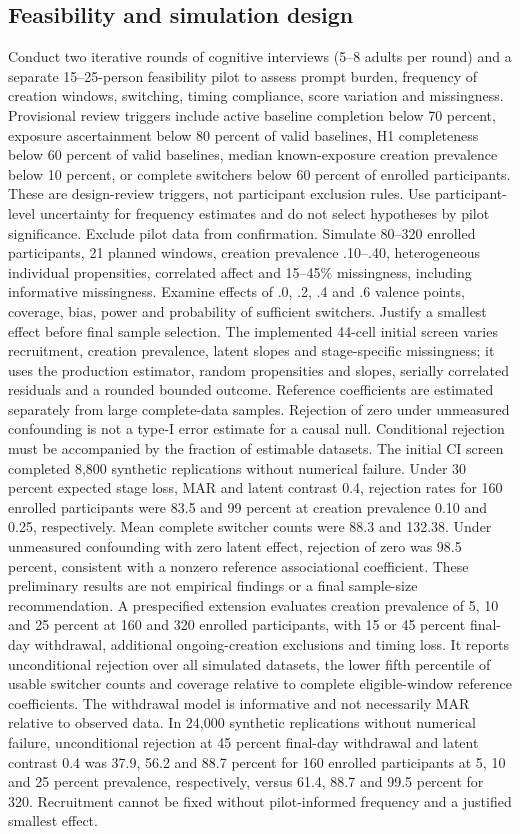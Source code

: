 \documentclass[11pt]{article}
\begin{document}
\subsection{Feasibility and simulation design}
Conduct two iterative rounds of cognitive interviews (5--8 adults per round) and a separate 15--25-person feasibility pilot to assess prompt burden, frequency of creation windows, switching, timing compliance, score variation and missingness. Provisional review triggers include active baseline completion below 70 percent, exposure ascertainment below 80 percent of valid baselines, H1 completeness below 60 percent of valid baselines, median known-exposure creation prevalence below 10 percent, or complete switchers below 60 percent of enrolled participants. These are design-review triggers, not participant exclusion rules. Use participant-level uncertainty for frequency estimates and do not select hypotheses by pilot significance. Exclude pilot data from confirmation. Simulate 80--320 enrolled participants, 21 planned windows, creation prevalence .10--.40, heterogeneous individual propensities, correlated affect and 15--45\% missingness, including informative missingness. Examine effects of .0, .2, .4 and .6 valence points, coverage, bias, power and probability of sufficient switchers. Justify a smallest effect before final sample selection. The implemented 44-cell initial screen varies recruitment, creation prevalence, latent slopes and stage-specific missingness; it uses the production estimator, random propensities and slopes, serially correlated residuals and a rounded bounded outcome. Reference coefficients are estimated separately from large complete-data samples. Rejection of zero under unmeasured confounding is not a type-I error estimate for a causal null. Conditional rejection must be accompanied by the fraction of estimable datasets. The initial CI screen completed 8,800 synthetic replications without numerical failure. Under 30 percent expected stage loss, MAR and latent contrast 0.4, rejection rates for 160 enrolled participants were 83.5 and 99 percent at creation prevalence 0.10 and 0.25, respectively. Mean complete switcher counts were 88.3 and 132.38. Under unmeasured confounding with zero latent effect, rejection of zero was 98.5 percent, consistent with a nonzero reference associational coefficient. These preliminary results are not empirical findings or a final sample-size recommendation. A prespecified extension evaluates creation prevalence of 5, 10 and 25 percent at 160 and 320 enrolled participants, with 15 or 45 percent final-day withdrawal, additional ongoing-creation exclusions and timing loss. It reports unconditional rejection over all simulated datasets, the lower fifth percentile of usable switcher counts and coverage relative to complete eligible-window reference coefficients. The withdrawal model is informative and not necessarily MAR relative to observed data. In 24,000 synthetic replications without numerical failure, unconditional rejection at 45 percent final-day withdrawal and latent contrast 0.4 was 37.9, 56.2 and 88.7 percent for 160 enrolled participants at 5, 10 and 25 percent prevalence, respectively, versus 61.4, 88.7 and 99.5 percent for 320. Recruitment cannot be fixed without pilot-informed frequency and a justified smallest effect.
\end{document}
